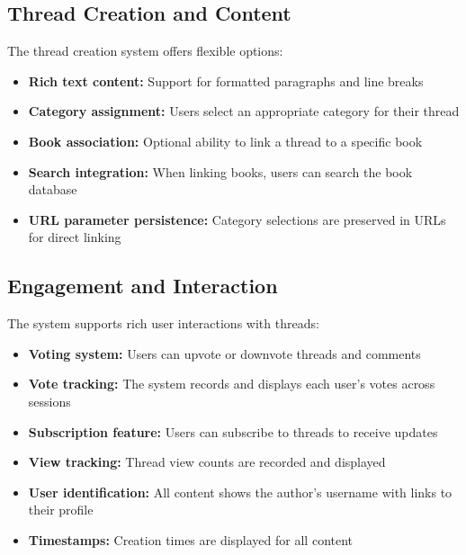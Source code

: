 \documentclass{article}
\begin{document}
\subsection{Thread Creation and Content}
The thread creation system offers flexible options:
\begin{itemize}
    \item \textbf{Rich text content:} Support for formatted paragraphs and line breaks
    \item \textbf{Category assignment:} Users select an appropriate category for their thread
    \item \textbf{Book association:} Optional ability to link a thread to a specific book
    \item \textbf{Search integration:} When linking books, users can search the book database
    \item \textbf{URL parameter persistence:} Category selections are preserved in URLs for direct linking
\end{itemize}

\subsection{Engagement and Interaction}
The system supports rich user interactions with threads:
\begin{itemize}
    \item \textbf{Voting system:} Users can upvote or downvote threads and comments
    \item \textbf{Vote tracking:} The system records and displays each user's votes across sessions
    \item \textbf{Subscription feature:} Users can subscribe to threads to receive updates
    \item \textbf{View tracking:} Thread view counts are recorded and displayed
    \item \textbf{User identification:} All content shows the author's username with links to their profile
    \item \textbf{Timestamps:} Creation times are displayed for all content
\end{itemize}
\end{document}

